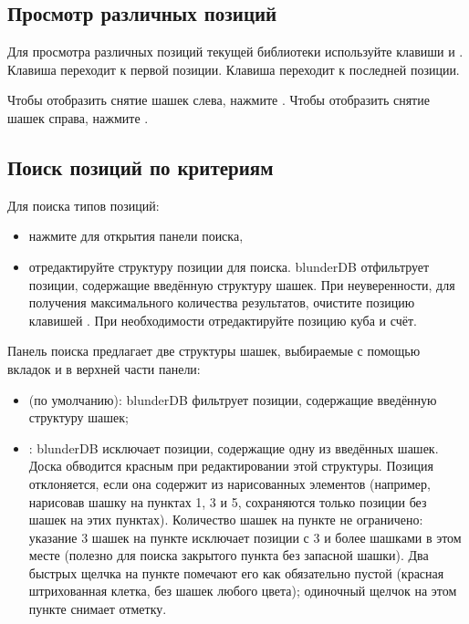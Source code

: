 \documentclass[letterpaper,10pt,russian]{sphinxmanual}
\begin{document}
\subsection{Просмотр различных позиций}
\label{\detokenize{guide_utilisateur:visualiser-les-differentes-positions}}
\sphinxAtStartPar
Для просмотра различных позиций текущей библиотеки используйте клавиши  и . Клавиша  переходит к первой позиции. Клавиша  переходит к последней позиции.

\sphinxAtStartPar
Чтобы отобразить снятие шашек слева, нажмите . Чтобы отобразить снятие шашек справа, нажмите .


\subsection{Поиск позиций по критериям}
\label{\detokenize{guide_utilisateur:rechercher-des-positions-selon-des-criteres}}
\sphinxAtStartPar
Для поиска типов позиций:
\begin{itemize}
\item {} 
\sphinxAtStartPar
нажмите  для открытия панели поиска,

\item {} 
\sphinxAtStartPar
отредактируйте структуру позиции для поиска. blunderDB отфильтрует позиции, содержащие  введённую структуру шашек. При неуверенности, для получения максимального количества результатов, очистите позицию клавишей . При необходимости отредактируйте позицию куба и счёт.

\end{itemize}

\sphinxAtStartPar
Панель поиска предлагает две структуры шашек, выбираемые с помощью вкладок  и  в верхней части панели:
\begin{itemize}
\item {} 
\sphinxAtStartPar
{} (по умолчанию): blunderDB фильтрует позиции, содержащие  введённую структуру шашек;

\item {} 
\sphinxAtStartPar
{}: blunderDB исключает позиции, содержащие одну из введённых шашек. Доска обводится красным при редактировании этой структуры. Позиция отклоняется, если она содержит  из нарисованных элементов (например, нарисовав шашку на пунктах 1, 3 и 5, сохраняются только позиции без шашек на этих пунктах). Количество шашек на пункте не ограничено: указание 3 шашек на пункте исключает позиции с 3 и более шашками в этом месте (полезно для поиска закрытого пункта без запасной шашки). Два быстрых щелчка на пункте помечают его как обязательно пустой (красная штрихованная клетка, без шашек любого цвета); одиночный щелчок на этом пункте снимает отметку.

\end{itemize}
\end{document}
